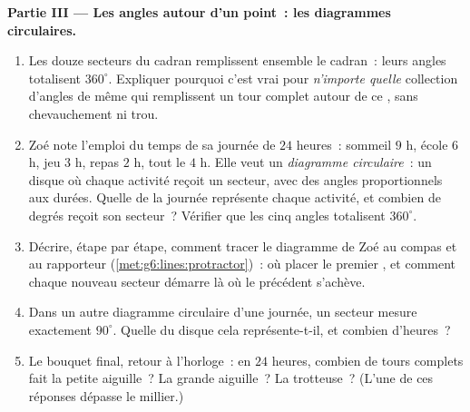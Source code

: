 \begin{problem}
\medskip
\noindent\textbf{Partie III --- Les angles autour d'un point~: les
diagrammes circulaires.}
\begin{enumerate}[resume]
  \item Les douze secteurs du cadran remplissent ensemble le cadran~:
        leurs angles totalisent $360^\circ$. Expliquer pourquoi c'est
        vrai pour \emph{n'importe quelle} collection d'angles de même
         qui remplissent un tour complet autour de ce ,
        sans chevauchement ni trou.
  \item Zoé note l'emploi du temps de sa journée de $24$ heures~:
        sommeil $9$ h, école $6$ h, jeu $3$ h, repas $2$ h, tout le
         $4$ h. Elle veut un \emph{diagramme circulaire}~: un
        disque où chaque activité reçoit un secteur, avec des angles
        proportionnels aux durées. Quelle  de la journée
        représente chaque activité, et combien de degrés reçoit son
        secteur~? Vérifier que les cinq angles totalisent $360^\circ$.
  \item Décrire, étape par étape, comment tracer le diagramme de Zoé
        au compas et au rapporteur (\cref{met:g6:lines:protractor})~:
        où placer le premier , et comment chaque nouveau secteur
        démarre là où le précédent s'achève.
  \item Dans un autre diagramme circulaire d'une journée, un secteur
        mesure exactement $90^\circ$. Quelle  du disque
        cela représente-t-il, et combien d'heures~?
  \item Le bouquet final, retour à l'horloge~: en $24$ heures,
        combien de tours complets fait la petite aiguille~? La grande
        aiguille~? La trotteuse~? (L'une de ces réponses dépasse le
        millier.)
\end{enumerate}
\end{problem}
